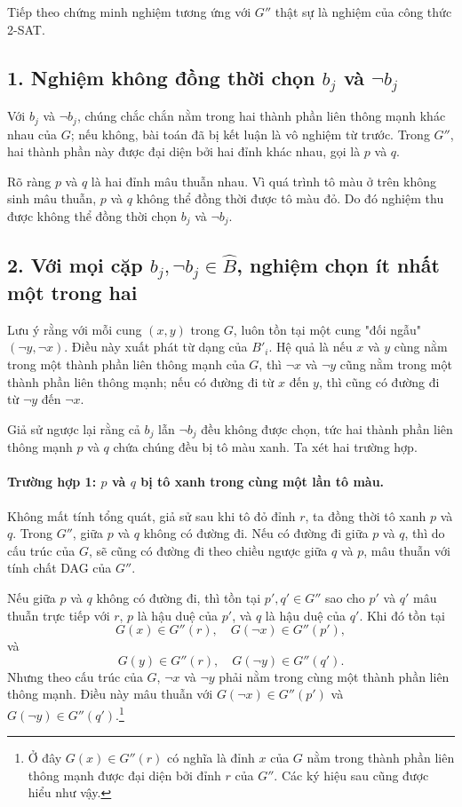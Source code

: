 \documentclass[11pt]{article}
\begin{document}
Tiếp theo chứng minh nghiệm tương ứng với $G''$ thật sự là nghiệm của công
thức 2-SAT.

\subsection*{1. Nghiệm không đồng thời chọn $b_j$ và $\neg b_j$}

Với $b_j$ và $\neg b_j$, chúng chắc chắn nằm trong hai thành phần liên thông
mạnh khác nhau của $G$; nếu không, bài toán đã bị kết luận là vô nghiệm từ
trước. Trong $G''$, hai thành phần này được đại diện bởi hai đỉnh khác nhau,
gọi là $p$ và $q$.

Rõ ràng $p$ và $q$ là hai đỉnh mâu thuẫn nhau. Vì quá trình tô màu ở trên
không sinh mâu thuẫn, $p$ và $q$ không thể đồng thời được tô màu đỏ. Do đó
nghiệm thu được không thể đồng thời chọn $b_j$ và $\neg b_j$.

\subsection*{2. Với mọi cặp $b_j,\neg b_j\in\hat B$, nghiệm chọn ít nhất một trong hai}

Lưu ý rằng với mỗi cung $(x,y)$ trong $G$, luôn tồn tại một cung "đối ngẫu"
$(\neg y,\neg x)$. Điều này xuất phát từ dạng của $B'_i$. Hệ quả là nếu $x$ và
$y$ cùng nằm trong một thành phần liên thông mạnh của $G$, thì $\neg x$ và
$\neg y$ cũng nằm trong một thành phần liên thông mạnh; nếu có đường đi từ $x$
đến $y$, thì cũng có đường đi từ $\neg y$ đến $\neg x$.

Giả sử ngược lại rằng cả $b_j$ lẫn $\neg b_j$ đều không được chọn, tức hai
thành phần liên thông mạnh $p$ và $q$ chứa chúng đều bị tô màu xanh. Ta xét hai
trường hợp.

\paragraph{Trường hợp 1: $p$ và $q$ bị tô xanh trong cùng một lần tô màu.}
Không mất tính tổng quát, giả sử sau khi tô đỏ đỉnh $r$, ta đồng thời tô xanh
$p$ và $q$. Trong $G''$, giữa $p$ và $q$ không có đường đi. Nếu có đường đi
giữa $p$ và $q$, thì do cấu trúc của $G$, sẽ cũng có đường đi theo chiều ngược
giữa $q$ và $p$, mâu thuẫn với tính chất DAG của $G''$.

Nếu giữa $p$ và $q$ không có đường đi, thì tồn tại $p',q'\in G''$ sao cho
$p'$ và $q'$ mâu thuẫn trực tiếp với $r$, $p$ là hậu duệ của $p'$, và $q$ là
hậu duệ của $q'$. Khi đó tồn tại
\[
  G(x)\in G''(r),\quad G(\neg x)\in G''(p'),
\]
và
\[
  G(y)\in G''(r),\quad G(\neg y)\in G''(q').
\]
Nhưng theo cấu trúc của $G$, $\neg x$ và $\neg y$ phải nằm trong cùng một
thành phần liên thông mạnh. Điều này mâu thuẫn với
$G(\neg x)\in G''(p')$ và $G(\neg y)\in G''(q')$.\footnote{Ở đây
$G(x)\in G''(r)$ có nghĩa là đỉnh $x$ của $G$ nằm trong thành phần liên thông
mạnh được đại diện bởi đỉnh $r$ của $G''$. Các ký hiệu sau cũng được hiểu như
vậy.}
\end{document}
